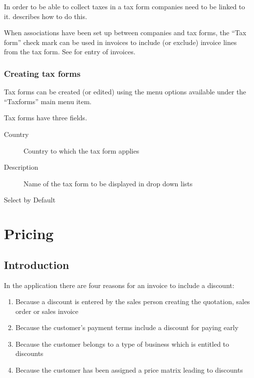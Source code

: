 In order to be able to collect taxes in a tax form companies need to be
linked to it.  describes how to do this.

When associations have been set up between companies and
tax forms, the ``Tax form'' check mark can be used in invoices to include
(or exclude) invoice lines from the tax form. See 
for entry of invoices.


\subsection{Creating tax forms}

Tax forms can be created (or edited) using the menu options available under the
``Taxforms'' main menu item.

Tax forms have three fields.

\begin{description}
\item [Country] Country to which the tax form applies
\item [Description] Name of the tax form to be displayed in drop down lists
\item [Select by Default] %
\end{description}



\chapter{Pricing}

\section{Introduction}

In the application there are four reasons for an invoice to include a discount:

\begin{enumerate}
\item Because a discount is entered by the sales person creating the quotation,
  sales order or sales invoice
\item Because the customer's payment terms include a discount for paying early
\item Because the customer belongs to a type of business which is entitled to discounts
\label{item:PricingBusinessType}
\item Because the customer has been assigned a price matrix leading to discounts
\label{item:PricingPriceMatrix}
\end{enumerate}

